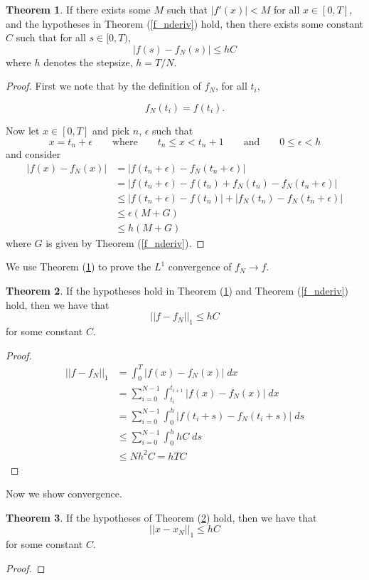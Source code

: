 \documentclass[11pt]{article}
\numberwithin{equation}{section}
\theoremstyle{definition}
\newtheorem{theorem}{Theorem}[section]
\newcommand{\eq}[1]{\begin{align*}#1\end{align*}}
\newcommand{\eqn}[2]{
  \begin{equation}
    \label{#1}
    #2
  \end{equation}
}
\newcommand{\thr}[1]{Theorem (\ref{#1})}
\begin{document}
\begin{theorem}
  \label{f_dist_bound}
  If there exists some $M$ such that $|f'(x)| < M$ for all $x \in [0, T]$,
  and the hypotheses in \thr{f_nderiv} hold,
  then there exists some constant $C$ such that for all $s \in [0, T)$,
  $$
    |f(s) - f_N(s)|
    \leq
    hC
  $$
  where $h$ denotes the stepsize, $h = T/N$.
\end{theorem}
\begin{proof}
First we note that by the definition of $f_N$, for all $t_i$,
\eqn{f_ndefin_relation}{
  f_N(t_i) = f(t_i).
}
Now let $x \in [0, T]$ and pick $n$, $\epsilon$ such that
$$
  x = t_n + \epsilon
  \qquad
  \text{where}
  \qquad
  t_n \leq x < t_n+1
  \qquad
  \text{and}
  \qquad
  0 \leq \epsilon < h
$$
and consider
\eq{
  |f(x) - f_N(x)| &= |f(t_n + \epsilon) - f_N(t_n + \epsilon)| \\
  &= |f(t_n + \epsilon) - f(t_n) + f_N(t_n) - f_N(t_n + \epsilon)| \\
  &\leq |f(t_n + \epsilon) - f(t_n)| + |f_N(t_n) - f_N(t_n + \epsilon)| \\
  &\leq \epsilon (M + G) \\
  &\leq h(M + G)
}
where $G$ is given by \thr{f_nderiv}.
\end{proof}

We use \thr{f_dist_bound} to prove the $L^1$ convergence of $f_N \rightarrow f$.

\begin{theorem}
  \label{f_convergence}
  If the hypotheses hold in \thr{f_dist_bound} and \thr{f_nderiv} hold,
  then we have that
$$
  || f - f_N ||_1 \leq h C
$$
  for some constant $C$.
\end{theorem}
\begin{proof}
\eq{
  || f - f_N || _1
  &=
  \int_0^T |f(x) - f_N(x) |
  \; dx
  \\
%
%
  &= 
  \sum_{i=0}^{N-1} \int_{t_i}^{t_{i+1}}
  |f(x) - f_N(x)|
  \; dx
  \\
%
%
  &=
  \sum_{i=0}^{N-1}
  \int_0^h |f(t_i + s) - f_N(t_i + s)|
  \; ds
  \\
%
%
  &\leq
  \sum_{i=0}^{N-1}
  \int_0^h hC
  \; ds
  \\
%
%
  &\leq
  Nh^2 C
  =
  hTC
}
\end{proof}
Now we show convergence.
\begin{theorem}
  \label{convergence}
  If the hypotheses of \thr{f_convergence} hold,
  then we have that
$$
  ||x - x_N||_1
  \leq
  hC
$$
  for some constant $C$.
\end{theorem}
\begin{proof}
\end{proof}
\end{document}
